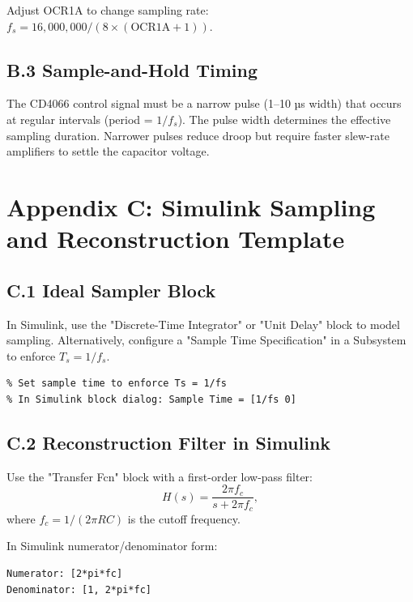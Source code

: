 \documentclass[11pt,letterpaper]{article}
\begin{document}
Adjust OCR1A to change sampling rate: $f_s = 16,000,000 / (8 \times (\text{OCR1A} + 1))$.

\subsection*{B.3 Sample-and-Hold Timing}

The CD4066 control signal must be a narrow pulse (1--10 µs width) that occurs at regular intervals (period = $1/f_s$). The pulse width determines the effective sampling duration. Narrower pulses reduce droop but require faster slew-rate amplifiers to settle the capacitor voltage.

\clearpage

\section*{Appendix C: Simulink Sampling and Reconstruction Template}

\subsection*{C.1 Ideal Sampler Block}

In Simulink, use the "Discrete-Time Integrator" or "Unit Delay" block to model sampling. Alternatively, configure a "Sample Time Specification" in a Subsystem to enforce $T_s = 1/f_s$.

\begin{verbatim}
% Set sample time to enforce Ts = 1/fs
% In Simulink block dialog: Sample Time = [1/fs 0]
\end{verbatim}

\subsection*{C.2 Reconstruction Filter in Simulink}

Use the "Transfer Fcn" block with a first-order low-pass filter:
\begin{equation}
H(s) = \frac{2\pi f_c}{s + 2\pi f_c},
\end{equation}
where $f_c = 1 / (2\pi RC)$ is the cutoff frequency.

In Simulink numerator/denominator form:
\begin{verbatim}
Numerator: [2*pi*fc]
Denominator: [1, 2*pi*fc]
\end{verbatim}
\end{document}
